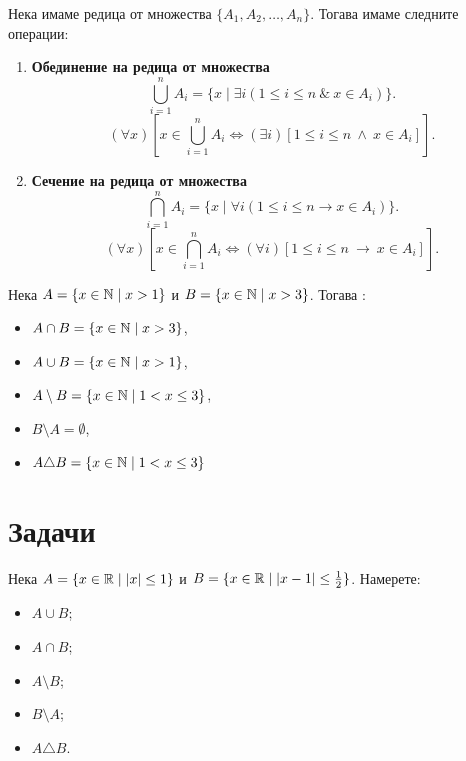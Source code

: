   Нека имаме редица от множества $\{A_1,A_2,\dots,A_n\}$.
  Тогава имаме следните операции:
  \begin{enumerate}[{\bf (I)}]
  \item
    {\bf Обединение на редица от множества}
    \[\bigcup^{n}_{i=1} A_i = \{x \mid \exists i (1\leq i\leq n\ \&\ x\in A_i)\}.\]
    \[(\forall x)[x \in \bigcup^n_{i=1}A_i \iff (\exists i)[1 \leq i \leq n\ \wedge\ x \in A_i]].\]
  \item
    {\bf Сечение на редица от множества}
    \[\bigcap^{n}_{i=1} A_i = \{x \mid \forall i (1\leq i\leq n \rightarrow x\in A_i)\}.\]
    \[(\forall x)[x \in \bigcap^n_{i=1}A_i \iff (\forall i)[1 \leq i \leq n\ \rightarrow\ x \in A_i]].\]
  \end{enumerate}

\begin{example}
  Нека $A = \{x\in\mathbb{N}\mid x > 1\}$ и $B = \{x\in\mathbb{N}\mid x>3\}$. Тогава :
  \begin{itemize}
    \item
      $A\cap B = \{x\in\mathbb{N}\mid x > 3\}$,
    \item
      $A\cup B = \{x\in\mathbb{N}\mid x > 1\}$,
    \item
      $A\setminus B = \{x\in\mathbb{N}\mid 1<x\leq 3\}$,
    \item
      $B\setminus A = \emptyset$,
    \item
      $A\triangle B = \{x\in\mathbb{N}\mid 1<x\leq 3\}$
    \end{itemize}
\end{example}

\section{Задачи}

\begin{problem}
  Нека $A = \{x\in\mathbb{R}\mid |x|\leq 1\}$ и $B = \{x\in\mathbb{R}\mid |x-1|\leq \frac{1}{2}\}$.
  Намерете:
  \begin{itemize}
  \item 
    $A\cup B$;
  \item
    $A\cap B$;
  \item
    $A\setminus B$;
  \item
    $B\setminus A$;
  \item
    $A \triangle B$.
  \end{itemize}
\end{problem}


